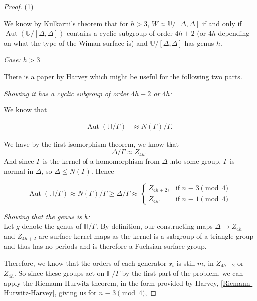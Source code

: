 \documentclass[reqno]{amsart}
\theoremstyle{definition}
\theoremstyle{remark}
\DeclareMathOperator{\Aut}{Aut}
\begin{document}
\begin{proof}
    (1)

    We know by Kulkarni's theorem that for $h >3$,
    $W \approx \mathbb{U}/ \left[\Delta, \Delta \right]$ if and only if
    $\Aut (\mathbb{U}/ \left[\Delta, \Delta \right]) $ contains a cyclic subgroup of
    order $4h+2$ (or $4h$ depending on what the type of the Wiman surface is) and $\mathbb{U}/ \left[\Delta, \Delta \right]$
    has genus $h$.\\
    \linebreak

    \textit{Case: $h > 3$}

There is a paper by Harvey \cite{Harvey} which might be useful for the following two parts.\\
\linebreak






\textit{Showing it has a cyclic subgroup of order $4h+2$
or $4h$:}\\
\linebreak

We know \cite[Prop. 2.35]{Girondo-Gonzalez-Diez} that 

\begin{align*}
\Aut( \mathbb{H} / \Gamma) 
&\approx
N(\Gamma)/ \Gamma.
\end{align*}

We have by the first isomorphism theorem, we know that
\[\Delta / \Gamma \approx Z_{4h}.\]
And since $\Gamma$ is the kernel of a homomorphism from
$\Delta$ into some group, $\Gamma$ is normal in $\Delta$, so
$\Delta \leq N(\Gamma)$.
Hence

\[\Aut (\mathbb{H}/\Gamma) \approx
N(\Gamma) / \Gamma \geq \Delta / \Gamma \approx 
\begin{cases}
    Z_{4h+2},& \text{if } n \equiv 3 \pmod{4}\\
    Z_{4h},& \text{if } n \equiv 1 \pmod{4}
\end{cases}
\]


\textit{Showing that the genus is $h$:}\\

Let $g$ denote the genus of $\mathbb{H}/\Gamma$. By definition, our constructing maps
$\Delta \to Z_{4h}$ and $Z_{4h+2}$ are
surface-kernel maps as the kernel is a subgroup
of a triangle group and thus has no periods and is therefore a Fuchsian surface group. 

Therefore, we know that the orders of each
generator $x_i$ is still $m_i$ in $Z_{4h+2}$ or
$Z_{4h}$. So since these groups act on
$\mathbb{H}/ \Gamma$ by the first part of the problem, we can apply the Riemann-Hurwitz theorem, in the form provided by Harvey, \eqref{Riemann-Hurwitz-Harvey}, giving us for $n \equiv 3 \pmod{4}$,


\end{proof}
\end{document}
